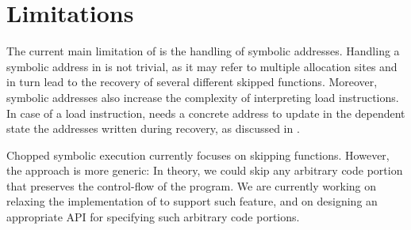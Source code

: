\section{Limitations}
The current main limitation of \toolname is
the handling of symbolic addresses. Handling a symbolic address in
\toolname is not trivial, as it may refer to multiple allocation sites
and in turn lead to the recovery of several different skipped
functions. Moreover, symbolic addresses also increase the complexity
of interpreting load instructions. In case of a load instruction,
\toolname needs a concrete address to update in the dependent state
the addresses written during recovery, as discussed in .

Chopped symbolic execution currently focuses on skipping functions.
However, the approach is more generic: In theory, we could skip any
arbitrary code portion that preserves the control-flow of the
program. We are currently working on relaxing the implementation of
\toolname to support such feature, and on designing an appropriate API
for specifying such arbitrary code portions.

